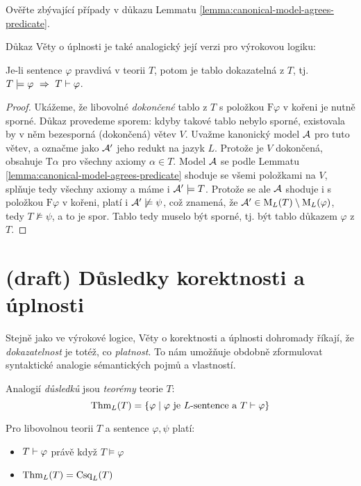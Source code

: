 \begin{exercise}
    Ověřte zbývající případy v důkazu Lemmatu \ref{lemma:canonical-model-agrees-predicate}.
\end{exercise}

Důkaz Věty o úplnosti je také analogický její verzi pro výrokovou logiku:

\begin{theorem}[O úplnosti]\label{theorem:completeness-theorem-predicate}
    Je-li sentence $\varphi$ pravdivá v teorii $T$, potom je tablo dokazatelná z $T$, tj. $T\models\varphi\ \Rightarrow\ T\proves\varphi$.    
\end{theorem} 

\begin{proof}
Ukážeme, že libovolné \emph{dokončené} tablo z $T$ s položkou $\mathrm{F}\varphi$ v kořeni je nutně sporné. Důkaz provedeme sporem: kdyby takové tablo nebylo sporné, existovala by v něm bezesporná (dokončená) větev $V$. Uvažme kanonický model $\mathcal{A}$ pro tuto větev, a označme jako $\mathcal{A}'$ jeho redukt na jazyk $L$. Protože je $V$ dokončená, obsahuje $\mathrm{T}\alpha$ pro všechny axiomy $\alpha\in T$. Model $\mathcal{A}$ se podle Lemmatu \ref{lemma:canonical-model-agrees-predicate} shoduje se všemi položkami na $V$, splňuje tedy všechny axiomy a máme i $\mathcal{A}'\models T$. Protože se ale $\mathcal{A}$ shoduje i s položkou $\mathrm{F}\varphi$ v kořeni, platí i $\mathcal{A}'\not\models\psi$, což znamená, že $\mathcal{A}'\in \operatorname{M}_L(T)\setminus\operatorname{M}_L(\varphi)$, tedy $T\not\models\psi$, a to je spor. Tablo tedy muselo být sporné, tj. být tablo důkazem $\varphi$ z $T$.
\end{proof}


\section{(draft) Důsledky korektnosti a úplnosti}\todo

Stejně jako ve výrokové logice, Věty o korektnosti a úplnosti dohromady říkají, že \emph{dokazatelnost} je totéž, co \emph{platnost}. To nám umožňuje obdobně zformulovat syntaktické analogie sémantických pojmů a vlastností.

Analogií \emph{důsledků} jsou \emph{teorémy} teorie $T$:
$$
\operatorname{Thm}_L(T)=\{\varphi\mid \varphi\text{ je $L$-sentence a } T\vdash\varphi\}
$$

\begin{corollary}[Dokazatelnost = platnost]\label{corollary:corollary-of-soundness-and-completeness}
    Pro libovolnou teorii $T$ a sentence $\varphi,\psi$ platí:
    \begin{itemize}
        \item $T\vdash\varphi$ právě když $T\models\varphi$
        \item $\operatorname{Thm}_L(T)=\operatorname{Csq}_L(T)$
    \end{itemize}
\end{corollary}

